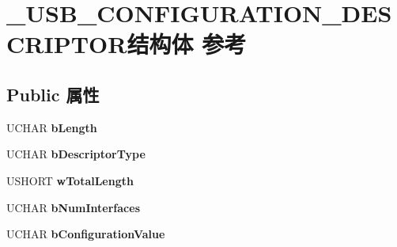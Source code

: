 \hypertarget{struct___u_s_b___c_o_n_f_i_g_u_r_a_t_i_o_n___d_e_s_c_r_i_p_t_o_r}{}\section{\+\_\+\+U\+S\+B\+\_\+\+C\+O\+N\+F\+I\+G\+U\+R\+A\+T\+I\+O\+N\+\_\+\+D\+E\+S\+C\+R\+I\+P\+T\+O\+R结构体 参考}
\label{struct___u_s_b___c_o_n_f_i_g_u_r_a_t_i_o_n___d_e_s_c_r_i_p_t_o_r}
\subsection*{Public 属性}
\begin{DoxyCompactItemize}
\item 
\mbox{\label{struct___u_s_b___c_o_n_f_i_g_u_r_a_t_i_o_n___d_e_s_c_r_i_p_t_o_r_aa3fa14befcf99f64e58eae0e82396d81}} 
U\+C\+H\+AR {\bfseries b\+Length}
\item 
\mbox{\label{struct___u_s_b___c_o_n_f_i_g_u_r_a_t_i_o_n___d_e_s_c_r_i_p_t_o_r_a7d1e5e764bbfb6ffa038210b28e34c31}} 
U\+C\+H\+AR {\bfseries b\+Descriptor\+Type}
\item 
\mbox{\label{struct___u_s_b___c_o_n_f_i_g_u_r_a_t_i_o_n___d_e_s_c_r_i_p_t_o_r_af1f0ce433032547471e586bfa97ce4ea}} 
U\+S\+H\+O\+RT {\bfseries w\+Total\+Length}
\item 
\mbox{\label{struct___u_s_b___c_o_n_f_i_g_u_r_a_t_i_o_n___d_e_s_c_r_i_p_t_o_r_aef43b1729f0010b602a25da02b352455}} 
U\+C\+H\+AR {\bfseries b\+Num\+Interfaces}
\item 
\mbox{\label{struct___u_s_b___c_o_n_f_i_g_u_r_a_t_i_o_n___d_e_s_c_r_i_p_t_o_r_a01803ca88af44935bc3335205f6deec1}} 
U\+C\+H\+AR {\bfseries b\+Configuration\+Value}
\item 
\mbox{\label{struct___u_s_b___c_o_n_f_i_g_u_r_a_t_i_o_n___d_e_s_c_r_i_p_t_o_r_ad70f87557423b74e8f1d23b059f36988}} 

\end{DoxyCompactItemize}
